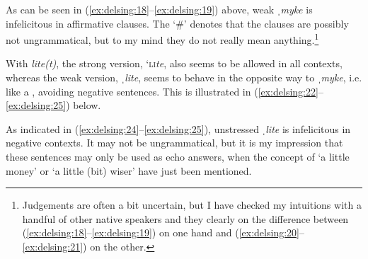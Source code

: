 \documentclass[output=paper]{langscibook}
\begin{document}
\begin{sloppypar}
As can be seen in (\ref{ex:delsing:18}–\ref{ex:delsing:19}) above, weak \textit{ˌmyke} is infelicitous in affirmative clauses. The ‘\#’ denotes that the clauses are possibly not ungrammatical, but to my mind they do not really mean anything.\footnote{Judgements are often a bit uncertain, but I have checked my intuitions with a handful of other native speakers and they clearly  on the difference between (\ref{ex:delsing:18}--\ref{ex:delsing:19}) on one hand and (\ref{ex:delsing:20}--\ref{ex:delsing:21}) on the other.}
\end{sloppypar}



With \textit{lite(t)}, the strong version, ‘\textsc{li}\textit{te}, also seems to be allowed in all contexts, whereas the weak version, \textit{ˌlite}, seems to behave in the opposite way to \textit{ˌmyke}, i.e. like a , avoiding negative sentences. This is illustrated in (\ref{ex:delsing:22}--\ref{ex:delsing:25}) below.

{\judgewidth{\#}
\z}


As indicated in (\ref{ex:delsing:24}--\ref{ex:delsing:25}), unstressed \textit{ˌlite} is infelicitous in negative contexts. It may not be ungrammatical, but it is my impression that these sentences may only be used as echo answers, when the concept of ‘a little money’ or ‘a little (bit) wiser’ have just been mentioned.
\end{document}
